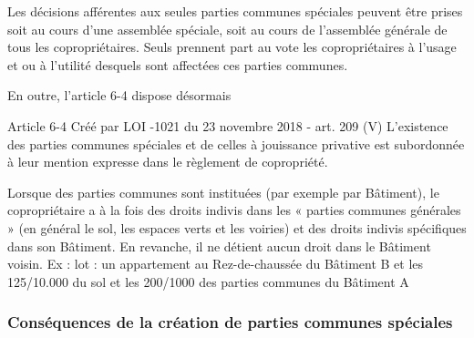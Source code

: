 		Les décisions afférentes aux seules parties communes spéciales peuvent être prises soit au cours d'une
		assemblée spéciale, soit au cours de l'assemblée générale de tous les copropriétaires. Seuls prennent
		part au vote les copropriétaires à l'usage et ou à l'utilité desquels sont affectées ces parties communes.
		
		En outre, l’article 6-4 dispose désormais
		
		Article 6-4 Créé par LOI -1021 du 23 novembre 2018 - art. 209 (V)
		L'existence des parties communes spéciales et de celles à jouissance privative est subordonnée à leur
		mention expresse dans le règlement de copropriété.
		
		Lorsque des parties communes sont instituées (par exemple par Bâtiment), le copropriétaire a à la fois des
		droits indivis dans les « parties communes générales » (en général le sol, les espaces verts et les voiries)
		et des droits indivis spécifiques dans son Bâtiment. En revanche, il ne détient aucun droit dans le Bâtiment
		voisin.
		Ex : lot  : un appartement au Rez-de-chaussée du Bâtiment B et les 125/10.000 du sol et les 200/1000
		des parties communes du Bâtiment A
		
		\subsubsection{Conséquences de la création de parties communes spéciales}
		
